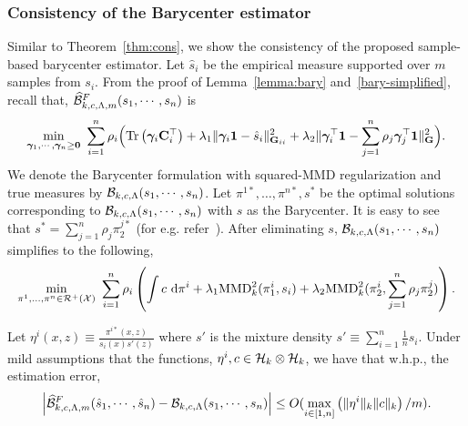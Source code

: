 \subsubsection{Consistency of the Barycenter estimator}\label{bconsistent}
Similar to Theorem~\ref{thm:cons}, we show the consistency of the proposed sample-based barycenter estimator. Let $\hat{s}_i$ be the empirical measure supported over $m$ samples from $s_i$.
From the proof of Lemma~\ref{lemma:bary} and~\ref{bary-simplified}, recall that, $\widehat{\mathcal{B}}^F_{k,c,\Lambda, m}(s_1, \cdots, s_n)$ is
\begin{align*}
   \min\limits_{\bm{\gamma}_1,\cdots, \bm{\gamma}_n\ge\mathbf{0}}\ \sum_{i=1}^n \rho_i\Big(\textup{Tr}\left(\bm{\gamma}_i\mathbf{C}_i^\top\right)+\lambda_1\|\bm{\gamma}_i\mathbf{1}-\hat{s}_i\|^2_{\mathbf{G}_{ii}}+\lambda_2\|\bm{\gamma}_i^\top\mathbf{1}-\sum_{j=1}^n\rho_j\bm{\gamma}_j^\top\mathbf{1}\|^2_{\mathbf{G}}\Big).
\end{align*}
We denote the Barycenter formulation with squared-MMD regularization and true measures by $\mathcal{B}_{k, c, \Lambda}(s_1, \cdots, s_n)$. Let $\pi^{1*},\ldots,\pi^{n*},s^*$ be the optimal solutions corresponding to $\mathcal{B}_{k, c, \Lambda}(s_1, \cdots, s_n)$ with $s$ as the Barycenter. It is easy to see that  $s^*=\sum_{j=1}^n\rho_j\pi^{j*}_2$ (for e.g. refer~\citet[Sec C]{Cohen2020}). After eliminating $s$, $\mathcal{B}_{k, c, \Lambda}(s_1, \cdots, s_n)$ simplifies to the following, $$\min\limits_{\pi^1,\ldots,\pi^n\in\calR^+(\calX)}\ \sum_{i=1}^n\rho_i\left(\int c ~\textup{d}\pi^i + \lambda_1 \MMD_k^2(\pi^i_1, s_i)+\lambda_2 \MMD_k^2(\pi^i_2, \sum_{j=1}^n\rho_j\pi^j_2)\right) .$$ 
\begin{theoremBox}
\begin{theorem}
    \label{thm:bcons}
     Let $\eta^i(x, z)\equiv \frac{\pi^{i*}(x, z)}{s_i(x)s'(z)}$ where $s'$ is the mixture density $s'\equiv\sum_{i=1}^n\frac{1}{n}s_i$. Under mild assumptions that the functions, $\eta^i, c\in \mathcal{H}_k\otimes \mathcal{H}_k $, we have that w.h.p., the estimation error, $$\left|\widehat{\mathcal{B}}^F_{k,c,\Lambda, m}(\hat{s}_1, \cdots, \hat{s}_n) - \mathcal{B}_{k, c, \Lambda}(s_1, \cdots, s_n)\right|\leq O(\max\limits_{i\in [1, n]}\left(\|\eta^i\|_k\|c\|_k\right)/m).$$
\end{theorem}
\end{theoremBox}
